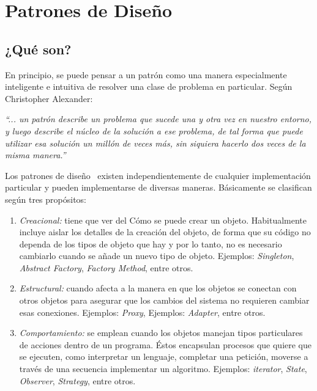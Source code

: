 \chapter{Patrones de Diseño}
\label{patrones}

\section{¿Qué son?}

En principio, se puede pensar a un patrón como una manera especialmente inteligente e intuitiva de resolver una clase de problema en particular. Según Christopher Alexander:

\begin{center}
\emph{``... un patrón describe un problema que sucede una y otra vez en nuestro entorno, y luego describe el núcleo de la solución a ese problema, de tal forma que puede utilizar esa solución un millón de veces más, sin siquiera hacerlo dos veces de la misma manera.''}
\end{center}

Los patrones de diseño~\cite{Gamma} existen independientemente de cualquier implementación particular y pueden implementarse de diversas maneras. Básicamente se clasifican según tres propósitos:
\begin{enumerate}
	\item \emph{Creacional:} tiene que ver del Cómo se puede crear un objeto. Habitualmente incluye aislar los detalles de la creación
							 del objeto, de forma que su código no dependa de los tipos de objeto que hay y por lo tanto, no es
							 necesario cambiarlo cuando se añade un nuevo tipo de objeto. Ejemplos: \emph{Singleton}, \emph{Abstract
							 Factory}, \emph{Factory Method}, entre otros.

	\item \emph{Estructural:} cuando afecta a la manera en que los objetos se conectan con otros objetos para asegurar que los cambios
							 del sistema no requieren cambiar esas conexiones. Ejemplos: \emph{Proxy}, Ejemplos: \emph{Adapter}, entre
							 otros.

	\item \emph{Comportamiento:} se emplean cuando los objetos manejan tipos particulares de acciones dentro de un programa. Éstos encapsulan procesos que quiere que se ejecuten, como interpretar un lenguaje, completar una petición, moverse a través de una secuencia  implementar un algoritmo. Ejemplos: \emph{iterator}, \emph{State}, \emph{Observer}, \emph{Strategy}, entre otros.
\end{enumerate}

